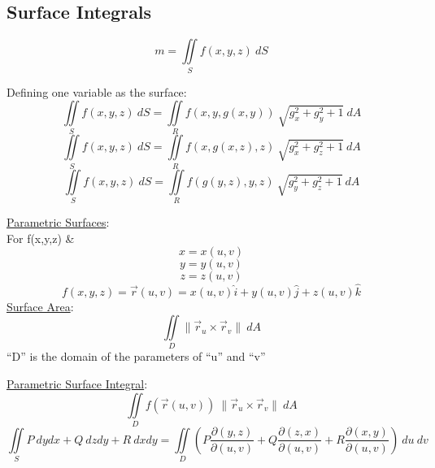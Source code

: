 \documentclass[12pt]{article}
\numberwithin{equation}{subsection}
\newcommand{\magp}[1]{\| #1 \|}
\newcommand{\indb}{\hspace{1cm}}
\begin{document}
\begin{flushleft}
\newpage
\subsection{Surface Integrals}
\begin{equation}
m= \iint \limits_S f(x,y,z)\ dS
\end{equation}

Defining one variable as the surface:
\begin{equation}
\iint \limits_S f(x,y,z)\ dS = \iint \limits_R f(x,y,g(x,y))\ \sqrt{g_x^2 + g_y^2 + 1}\ dA
\end{equation}
\begin{equation}
\iint \limits_S f(x,y,z)\ dS = \iint \limits_R f(x,g(x,z),z)\ \sqrt{g_x^2 + g_z^2 + 1}\ dA
\end{equation}
\begin{equation}
\iint \limits_S f(x,y,z)\ dS = \iint \limits_R f(g(y,z),y,z)\ \sqrt{g_y^2 + g_z^2 + 1}\ dA
\end{equation}

\underline{Parametric Surfaces}:\\
\indb For f(x,y,z) \&
$$ x = x(u,v) $$
$$ y = y(u,v) $$
$$ z = z(u,v) $$
\begin{equation}
f(x,y,z) = \vec{r}(u,v) = x(u,v)\hat{i} + y(u,v)\hat{j} + z(u,v)\hat{k}
\end{equation}
\underline{Surface Area}:
\begin{equation}
\iint \limits_D \magp{\vec{r}_u \times \vec{r}_v }\ dA
\end{equation}
\indb ``D'' is the domain of the parameters of ``u'' and ``v''

\bigskip
\underline{Parametric Surface Integral}:
\begin{equation}
\iint \limits_D f(\vec{r}(u,v))\ \magp{\vec{r}_u \times \vec{r}_v }\ dA
\end{equation}
\begin{equation}
\iint \limits_S P\ dydx + Q\ dzdy + R\ dxdy = \iint \limits_D \left( P\frac{\partial (y,z)}{\partial(u,v)}+Q\frac{\partial (z,x)}{\partial(u,v)}+R\frac{\partial (x,y)}{\partial(u,v)} \right)\ du\ dv
\end{equation}


\end{flushleft}
\end{document}
